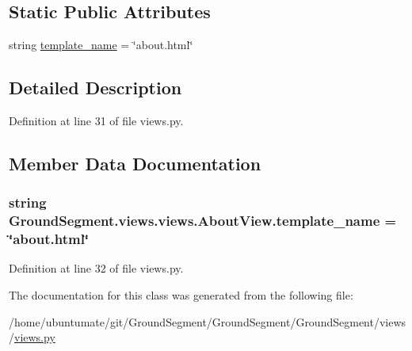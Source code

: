 \subsection*{Static Public Attributes}
\begin{DoxyCompactItemize}
\item 
string \hyperlink{class_ground_segment_1_1views_1_1views_1_1_about_view_af0aab86b8b1a3c0ca1734a56b0d1f138}{template\+\_\+name} = \char`\"{}about.\+html\char`\"{}
\end{DoxyCompactItemize}


\subsection{Detailed Description}


Definition at line 31 of file views.\+py.



\subsection{Member Data Documentation}
\hypertarget{class_ground_segment_1_1views_1_1views_1_1_about_view_af0aab86b8b1a3c0ca1734a56b0d1f138}{}
\subsubsection[{template\+\_\+name}]{\setlength{\rightskip}{0pt plus 5cm}string Ground\+Segment.\+views.\+views.\+About\+View.\+template\+\_\+name = \char`\"{}about.\+html\char`\"{}\hspace{0.3cm}{\ttfamily [static]}}\label{class_ground_segment_1_1views_1_1views_1_1_about_view_af0aab86b8b1a3c0ca1734a56b0d1f138}


Definition at line 32 of file views.\+py.



The documentation for this class was generated from the following file\+:\begin{DoxyCompactItemize}
\item 
/home/ubuntumate/git/\+Ground\+Segment/\+Ground\+Segment/\+Ground\+Segment/views/\hyperlink{views_8py}{views.\+py}\end{DoxyCompactItemize}
